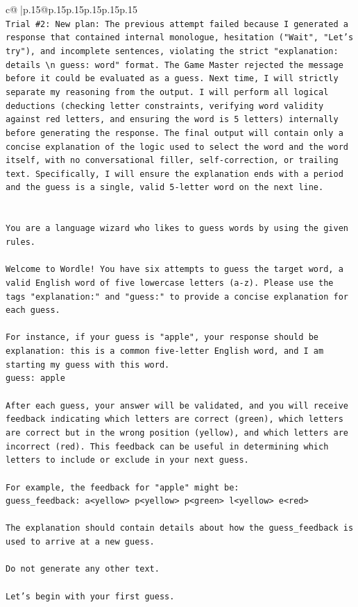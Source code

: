 \documentclass{article}
\begin{document}
{\begin{supertabular}{c@{$\;$}|p{.15\linewidth}@{}p{.15\linewidth}p{.15\linewidth}p{.15\linewidth}p{.15\linewidth}p{.15\linewidth}}
{{{\\ 
\texttt{Trial \#2: New plan: The previous attempt failed because I generated a response that contained internal monologue, hesitation ("Wait", "Let's try"), and incomplete sentences, violating the strict "explanation: details \textbackslash{}n guess: word" format. The Game Master rejected the message before it could be evaluated as a guess. Next time, I will strictly separate my reasoning from the output. I will perform all logical deductions (checking letter constraints, verifying word validity against red letters, and ensuring the word is 5 letters) internally before generating the response. The final output will contain only a concise explanation of the logic used to select the word and the word itself, with no conversational filler, self{-}correction, or trailing text. Specifically, I will ensure the explanation ends with a period and the guess is a single, valid 5{-}letter word on the next line.} \\
\\ 
\\ 
\texttt{You are a language wizard who likes to guess words by using the given rules.} \\
\\ 
\texttt{Welcome to Wordle! You have six attempts to guess the target word, a valid English word of five lowercase letters (a{-}z). Please use the tags "explanation:" and "guess:" to provide a concise explanation for each guess.} \\
\\ 
\texttt{For instance, if your guess is "apple", your response should be} \\
\texttt{explanation: this is a common five{-}letter English word, and I am starting my guess with this word.} \\
\texttt{guess: apple} \\
\\ 
\texttt{After each guess, your answer will be validated, and you will receive feedback indicating which letters are correct (green), which letters are correct but in the wrong position (yellow), and which letters are incorrect (red). This feedback can be useful in determining which letters to include or exclude in your next guess.} \\
\\ 
\texttt{For example, the feedback for "apple" might be:} \\
\texttt{guess\_feedback: a<yellow> p<yellow> p<green> l<yellow> e<red>} \\
\\ 
\texttt{The explanation should contain details about how the guess\_feedback is used to arrive at a new guess.} \\
\\ 
\texttt{Do not generate any other text.} \\
\\ 
\texttt{Let's begin with your first guess.} \\
            }
        }
    }
     \\ \\


\end{supertabular}}
\end{document}
